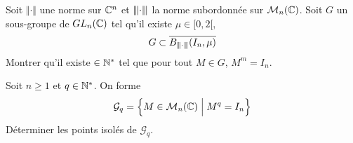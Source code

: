 \begin{exercise}
	Soit $\Vert\cdot\Vert$ une norme sur $\C^{n}$ et $\vertiii{\cdot}$ la norme subordonnée sur $\M_{n}(\C)$. Soit $G$ un sous-groupe de $GL_{n}(\C)$ tel qu'il existe $\mu\in[0,2[$,
	$$G\subset\overline{B_{\vertiii{\cdot}}(I_{n},\mu)}$$
	Montrer qu'il existe $\in\N^{*}$ tel que pour tout $M\in G$, $M^{m}=I_{n}$.
\end{exercise}

\begin{exercise}
	Soit $n\geqslant1$ et $q\in\N^{*}$. On forme 
	$$\mathcal{G}_{q}=\Bigl\{M\in\M_{n}(\C)\Bigm| M^{q}=I_{n}\Bigr\}$$
	Déterminer les points isolés de $\mathcal{G}_{q}$.
\end{exercise}